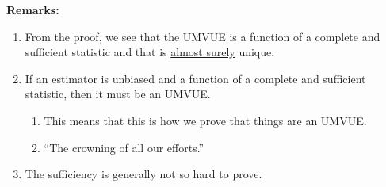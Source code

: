 \documentclass[11pt]{scrartcl}
\theoremstyle{definition}
\theoremstyle{remark}
\begin{document}
{\textbf{Remarks:}
\begin{enumerate}[noitemsep]
	\item From the proof, we see that the UMVUE is a function of a complete and sufficient statistic and that is \underline{almost surely} unique. 
	\item If an estimator is unbiased and a function of a complete and sufficient statistic, then it must be an UMVUE. 
	\begin{enumerate}[noitemsep]
		\item This means that this is how we prove that things are an UMVUE. 
		\item ``The crowning of all our efforts.''
	\end{enumerate}
	\item The sufficiency is generally not so hard to prove. 
\end{enumerate}

}
\end{document}
